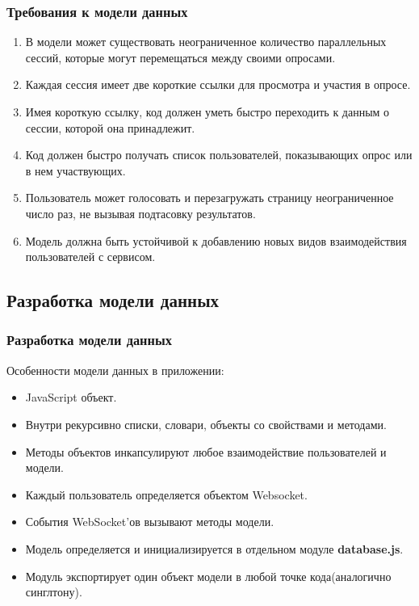 \documentclass{beamer}
\begin{document}
\begin{frame}
\frametitle{Требования к модели данных}
\begin{enumerate}
	\item В модели может существовать неограниченное количество параллельных сессий, которые могут перемещаться между своими опросами.
	\item Каждая сессия имеет две короткие ссылки для просмотра и участия в опросе. 
	\item Имея короткую ссылку, код должен уметь быстро переходить к данным о сессии, которой она принадлежит.
	\item Код должен быстро получать список пользователей, показывающих опрос или в нем участвующих.
	\item Пользователь может голосовать и перезагружать страницу неограниченное число раз, не вызывая подтасовку результатов.
	\item Модель должна быть устойчивой к добавлению новых видов взаимодействия пользователей с сервисом.
\end{enumerate}
\end{frame}


\subsection{Разработка модели данных}
\begin{frame}
\frametitle{Разработка модели данных}
	Особенности модели данных в приложении:
	\begin{itemize}
		\item JavaScript объект.
		\item Внутри рекурсивно списки, словари, объекты со свойствами и методами.
		\item Методы объектов инкапсулируют любое взаимодействие пользователей и модели.
		\item Каждый пользователь определяется объектом Websocket.
		\item События WebSocket'ов вызывают методы модели. 
		\item Модель определяется и инициализируется в отдельном модуле \textbf{database.js}.
		\item Модуль экспортирует один объект модели в любой точке кода(аналогично синглтону).
	\end{itemize}
\end{frame}
\end{document}
